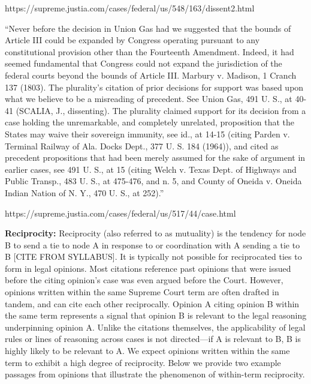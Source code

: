 \documentclass[headsepline=true, abstracton]{scrartcl}
\begin{document}
https://supreme.justia.com/cases/federal/us/548/163/dissent2.html


``Never before the decision in Union Gas had we suggested that the bounds of Article III could be expanded by Congress operating pursuant to any constitutional provision other than the Fourteenth Amendment. Indeed, it had seemed fundamental that Congress could not expand the jurisdiction of the federal courts beyond the bounds of Article III. Marbury v. Madison, 1 Cranch 137 (1803). The plurality's citation of prior decisions for support was based upon what we believe to be a misreading of precedent. See Union Gas, 491 U. S., at 40-41 (SCALIA, J., dissenting). The plurality claimed support for its decision from a case holding the unremarkable, and completely unrelated, proposition that the States may waive their sovereign immunity, see id., at 14-15 (citing Parden v. Terminal Railway of Ala. Docks Dept., 377 U. S. 184 (1964)), and cited as precedent propositions that had been merely assumed for the sake of argument in earlier cases, see 491 U. S., at 15 (citing Welch v. Texas Dept. of Highways and Public Transp., 483 U. S., at 475-476, and n. 5, and County of Oneida v. Oneida Indian Nation of N. Y., 470 U. S., at 252).''

https://supreme.justia.com/cases/federal/us/517/44/case.html


\textbf{Reciprocity:} Reciprocity (also referred to as mutuality) is the tendency for node B to send a tie to node A in response to or coordination with A sending a tie to B [CITE FROM SYLLABUS]. It is typically not possible for reciprocated ties to form in legal opinions. Most citations reference past opinions that were issued before the citing opinion's case was even argued before the Court.  However, opinions written within the same Supreme Court term are often drafted in tandem, and can cite each other reciprocally.  Opinion A citing opinion B within the same term represents a signal that opinion B is relevant to the legal reasoning underpinning opinion A. Unlike the citations themselves, the applicability of legal rules or lines of reasoning across cases is not directed---if A is relevant to B, B is highly likely to be relevant to A. We expect opinions written within the same term to exhibit a high degree of reciprocity. Below we provide two example passages from opinions that illustrate the phenomenon of within-term reciprocity.  
\end{document}
